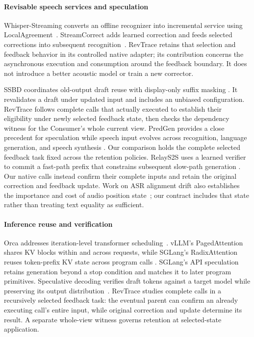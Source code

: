 \paragraph{Revisable speech services and speculation}
Whisper-Streaming converts an offline recognizer into incremental service
using LocalAgreement~\cite{machacek2023whisperstreaming}. StreamCorrect
adds learned correction and feeds selected corrections into subsequent
recognition~\cite{vu2026streamcorrect}. RevTrace retains that selection and
feedback behavior in its controlled native adapter; its contribution
concerns the asynchronous execution and consumption around the feedback
boundary. It does not introduce a better acoustic model or train a new
corrector.

SSBD coordinates old-output draft reuse with display-only suffix masking
\cite{zeng2026ssbd}. It revalidates a draft under updated input and includes
an unbiased configuration. RevTrace follows complete calls that actually
executed to establish their eligibility under newly selected feedback state,
then checks the dependency witness for the Consumer's whole current view.
PredGen provides a close precedent for speculation while speech input
evolves across recognition, language generation, and speech synthesis
\cite{li2025predgen}. Our comparison holds the complete selected feedback
task fixed across the retention policies. RelayS2S uses a learned verifier to commit a fast-path
prefix that constrains subsequent slow-path generation
\cite{mai2026relays2s}. Our native calls instead confirm their complete
inputs and retain the original correction and feedback update. Work on
ASR alignment drift also establishes the importance and cost of audio
position state~\cite{wang2026alignmentdrift}; our contract includes that
state rather than treating text equality as sufficient.

\paragraph{Inference reuse and verification}
Orca addresses iteration-level transformer scheduling~\cite{yu2022orca}.
vLLM's PagedAttention shares KV blocks within and across requests, while
SGLang's RadixAttention reuses token-prefix KV state across program calls
\cite{kwon2023pagedattention,zheng2024sglang}. SGLang's API speculation
retains generation beyond a stop condition and matches it to later
program primitives.
Speculative decoding verifies draft tokens against a target model while
preserving its output distribution~\cite{leviathan2023speculative}.
RevTrace studies complete calls in a recursively selected feedback task:
the eventual parent can confirm an already executing call's entire input,
while original correction and update determine its result. A separate
whole-view witness governs retention at selected-state application.

